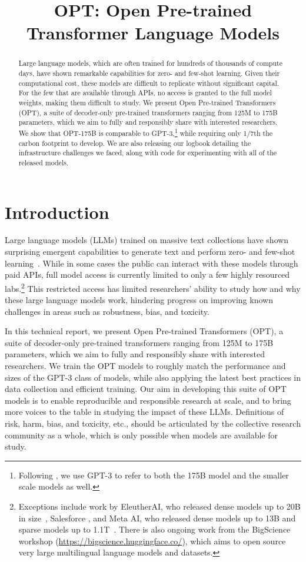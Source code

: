 \title{OPT: Open Pre-trained Transformer Language Models}

\begin{abstract}
Large language models, which are often trained for hundreds of thousands of compute days, have shown remarkable capabilities for zero- and few-shot learning. Given their computational cost, these models are difficult to replicate without significant capital.  For the few that are available through APIs, no access is granted to the full model weights, making them difficult to study. We present Open Pre-trained Transformers (OPT), a suite of decoder-only pre-trained transformers ranging from 125M to 175B parameters, which we aim to fully and responsibly share with interested researchers. We show that {OPT-175B} is comparable to {GPT-3},\footnote{Following \citet{brown2020gpt3}, we use {GPT-3} to  refer to both the 175B model and the smaller scale models as well.} while requiring only 1/7th the carbon footprint to develop.  We are also releasing our logbook detailing the infrastructure challenges we faced, along with code for experimenting with all of the released models.
\end{abstract}

\section{Introduction}

Large language models (LLMs) trained on massive text collections have shown surprising emergent capabilities to generate text and perform zero- and few-shot learning~\cite{brown2020gpt3,J1WhitePaper,megatron2022,gopher2022,palm2022}. While in some cases the public can interact with these models through paid APIs, full model access is currently limited to only a few highly resourced labs.\footnote{Exceptions include work by EleutherAI, who released dense models up to 20B in size~\cite{eleutherai2022}, Salesforce \cite{Nijkamp2022ACP}, and Meta AI, who released dense models up to 13B and sparse models up to 1.1T~\cite{1TMoE2021}. There is also ongoing work from the BigScience workshop (\url{https://bigscience.huggingface.co/}), which aims to open source very large multilingual language models and datasets.} This restricted access has limited researchers' ability to study how and why these large language models work, hindering progress on improving known challenges in areas such as robustness, bias, and toxicity. 

In this technical report, we present Open Pre-trained Transformers (OPT), a suite of decoder-only pre-trained transformers ranging from 125M to 175B parameters, which we aim to fully and responsibly share with interested researchers. We train the OPT models to roughly match the performance and sizes of the GPT-3 class of models, while also applying the latest best practices in data collection and efficient training. Our aim in developing this suite of OPT models is to enable reproducible and responsible research at scale, and to bring more voices to the table in studying the impact of these LLMs.  Definitions of risk, harm, bias, and toxicity, etc., should be articulated by the collective research community as a whole, which is only possible when models are available for study.  

